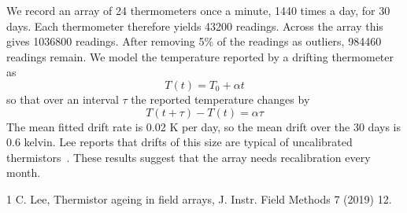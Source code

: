 \documentclass{article}
\begin{document}
We record an array of 24 thermometers once a minute, 1440 times a day, for 30 days.
Each thermometer therefore yields 43200 readings.
Across the array this gives 1036800 readings.
After removing 5\% of the readings as outliers, 984460 readings remain.
We model the temperature reported by a drifting thermometer as
\begin{equation}
  T(t) = T_0 + \alpha t \label{eq:model}
\end{equation}
so that over an interval $\tau$ the reported temperature changes by
\begin{equation}
  T(t + \tau) - T(t) = \alpha \tau \label{eq:drift}
\end{equation}
The mean fitted drift rate is 0.02 K per day, so the mean drift over the 30 days is 0.6 kelvin.
Lee reports that drifts of this size are typical of uncalibrated thermistors~\cite{lee2019}.
These results suggest that the array needs recalibration every month.
\begin{thebibliography}{1}
 C. Lee, Thermistor ageing in field arrays, J. Instr. Field Methods 7 (2019) 12.
\end{thebibliography}
\end{document}
